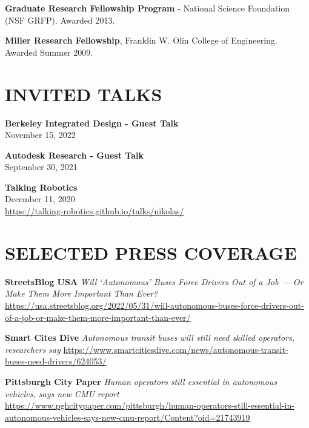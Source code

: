 \documentclass[11pt]{article} %
\begin{document}
\textbf{Graduate Research Fellowship Program} - National Science Foundation (NSF GRFP). Awarded 2013.
\medskip

\textbf{Miller Research Fellowship}, Franklin W. Olin College of Engineering. Awarded Summer 2009.


\section*{INVITED TALKS}
\textbf{Berkeley Integrated Design - Guest Talk}\\
November 15, 2022

\textbf{Autodesk Research - Guest Talk}\\
September 30, 2021
\medskip

 \textbf{Talking Robotics}\\
December 11, 2020\\
\url{https://talking-robotics.github.io/talks/nikolas/}


\section*{SELECTED PRESS COVERAGE}

\textbf{StreetsBlog USA}
\textit{Will ‘Autonomous’ Buses Force Drivers Out of a Job — Or Make Them More Important Than Ever?}
\sloppy
\href{https://usa.streetsblog.org/2022/05/31/will-autonomous-buses-force-drivers-out-of-a-job-or-make-them-more-important-than-ever/}{https://usa.streetsblog.org/2022/05/31/will-autonomous-buses-force-drivers-out-of-a-job-or-make-them-more-important-than-ever/}

\textbf{Smart Cites Dive}
\textit{Autonomous transit buses will still need skilled operators, researchers say}
\href{https://www.smartcitiesdive.com/news/autonomous-transit-buses-need-drivers/624053/}{https://www.smartcitiesdive.com/news/autonomous-transit-buses-need-drivers/624053/}

\textbf{Pittsburgh City Paper}
\textit{Human operators still essential in autonomous vehicles, says new CMU report}
\href{https://www.pghcitypaper.com/pittsburgh/human-operators-still-essential-in-autonomous-vehicles-says-new-cmu-report/Content?oid=21743919}{https://www.pghcitypaper.com/pittsburgh/human-operators-still-essential-in-autonomous-vehicles-says-new-cmu-report/Content?oid=21743919}
\end{document}
